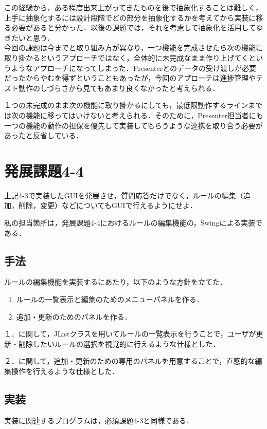 \documentclass[12pt]{jarticle}
\begin{document}
この経験から，ある程度出来上がってきたものを後で抽象化することは難しく，上手に抽象化するには設計段階でどの部分を抽象化するかを考えてから実装に移る必要があると分かった．以後の課題では，それを考慮して抽象化を活用してゆきたいと思う． \\

今回の課題は今までと取り組み方が異なり，一つ機能を完成させたら次の機能に取り掛かるというアプローチではなく，全体的に未完成なまま作り上げてくというようなアプローチになってしまった．Presenterとのデータの受け渡しが必要だったからやむを得ずということもあったが，今回のアプローチは進捗管理やテスト動作のしづらさから見てもあまり良くなかったと考えられる．

１つの未完成のまま次の機能に取り掛かるにしても，最低限動作するラインまでは次の機能に移ってはいけないと考えられる．そのために，Presenter担当者にも一つの機能の動作の担保を優先して実装してもらうような連携を取り合う必要があったと反省している．

\section{発展課題4-4}
\begin{screen}
上記4-3で実装したGUIを発展させ，質問応答だけでなく，ルールの編集（追加，削除，変更）などについてもGUIで行えるようにせよ．
\end{screen}
私の担当箇所は，発展課題4-4におけるルールの編集機能の，Swingによる実装である．

\subsection{手法}
ルールの編集機能を実装するにあたり，以下のような方針を立てた．
\begin{enumerate}
\item ルールの一覧表示と編集のためのメニューパネルを作る．
\item 追加・更新のためのパネルを作る．
\end{enumerate}

１．に関して，JListクラスを用いてルールの一覧表示を行うことで，ユーザが更新・削除したいルールの選択を視覚的に行えるような仕様とした．

２．に関して，追加・更新のための専用のパネルを用意することで，直感的な編集操作を行えるような仕様とした．

\subsection{実装}
実装に関連するプログラムは，必須課題4-3と同様である．
\end{document}
